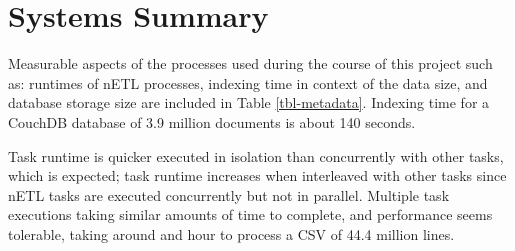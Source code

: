 \section{Systems Summary}
Measurable aspects of the processes used during the course of this project such as: runtimes of nETL processes, indexing time in context of the data size, and database storage size are included in Table \ref{tbl-metadata}. Indexing time for a CouchDB database of 3.9 million documents is about 140 seconds.

Task runtime is quicker executed in isolation than concurrently with other tasks, which is expected; task runtime increases when interleaved with other tasks since nETL tasks are executed concurrently but not in parallel. Multiple task executions taking similar amounts of time to complete, and performance seems tolerable, taking around and hour to process a CSV of 44.4 million lines.

